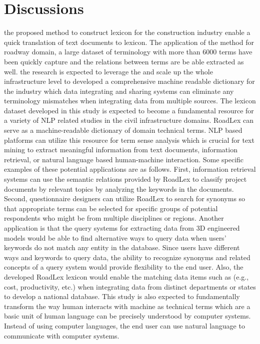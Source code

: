 \documentclass[Journal, BackFigs, DoubleSpace]{ascelike}%
\begin{document}
%
\section{Discussions} \label{sec:dis}
the proposed method to construct lexicon for the construction industry enable a quick translation of text documents to lexicon. The application of the method for roadway domain, a large dataset of terminology with more than 6000 terms have been quickly capture and the relations between terms are be able extracted as well. the research is expected to leverage the and scale up the whole infrastructure level to developed a comprehensive machine readable dictionary for the industry which data integrating and sharing systems can eliminate any terminology mismatches when integrating data from multiple sources. 
The lexicon dataset developed in this study is expected to become a fundamental resource for a variety of NLP related studies in the civil infrastructure domains. RoadLex can serve as a machine-readable dictionary of domain technical terms. NLP based platforms can utilize this resource for term sense analysis which is crucial for text mining to extract meaningful information from text documents, information retrieval, or natural language based human-machine interaction. Some specific examples of these potential applications are as follows. First, information retrieval systems can use the semantic relations provided by RoadLex to classify project documents by relevant topics by analyzing the keywords in the documents. Second, questionnaire designers can utilize RoadLex to search for synonyms so that appropriate terms can be selected for specific groups of potential respondents who might be from multiple disciplines or regions. Another application is that the query systems for extracting data from 3D engineered models would be able to find alternative ways to query data when users' keywords do not match any entity in the database. Since users have different ways and keywords to query data, the ability to recognize synonyms and related concepts of a query system would provide flexibility to the end user. Also, the developed RoadLex lexicon would enable the matching data items such as (e.g., cost, productivity, etc.) when integrating data from distinct departments or states to develop a national database. This study is also expected to fundamentally transform the way human interacts with machine as technical terms which are a basic unit of human language can be precisely understood by computer systems. Instead of using computer languages, the end user can use natural language to communicate with computer systems.
\end{document}
